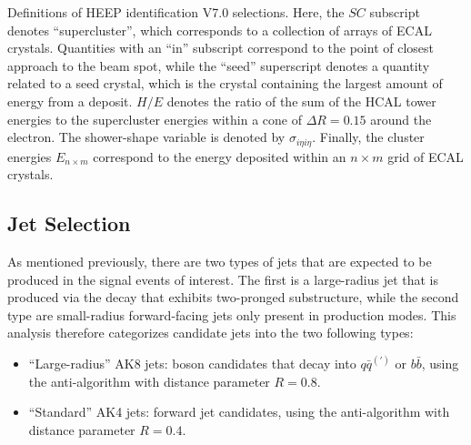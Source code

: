 \begin{table}[htbp]
  \centering
  
  \caption{
    Definitions of HEEP identification V7.0 selections.
    Here, the $SC$ subscript denotes ``supercluster'', which corresponds to a collection of arrays of ECAL crystals.
    Quantities with an ``in'' subscript correspond to the point of closest approach to the beam spot, while the ``seed'' superscript denotes a quantity related to a seed crystal, which is the crystal containing the largest amount of energy from a deposit.
    $H/E$ denotes the ratio of the sum of the HCAL tower energies to the supercluster energies within a cone of $\Delta R=0.15$ around the electron.
    The shower-shape variable is denoted by $\sigma_{i\eta i\eta}$.
    Finally, the cluster energies $E_{n\times m}$ correspond to the energy deposited within an $n\times m$ grid of ECAL crystals.
  }
  \label{tab:HEEPV70}
\end{table}

\subsection{Jet Selection}
\label{subsec:jetSelect}

As mentioned previously, there are two types of jets that are expected to be produced in the signal events of interest.
The first is a large-radius jet that is produced via the \VorH decay that exhibits two-pronged substructure, while the second type are small-radius forward-facing jets only present in \VBF production modes.
This analysis therefore categorizes candidate jets into the two following types:
\begin{itemize}
  \item ``Large-radius'' AK8 jets: \VorH boson candidates that decay into $q\bar{q}^{(\prime)}$ or $b\bar{b}$, using the anti-\kt algorithm with distance parameter $R=0.8$.
  \item ``Standard'' AK4 jets: \VBF forward jet candidates, using the anti-\kt algorithm with distance parameter $R=0.4$.
\end{itemize}

